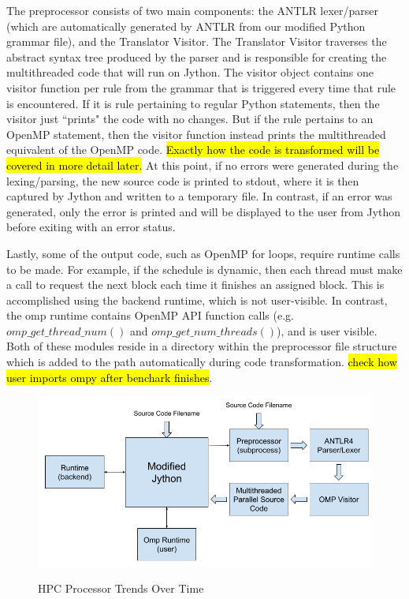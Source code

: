 \documentclass[letterpaper,12pt]{article} %
\begin{document}
The preprocessor consists of two main components: the ANTLR lexer/parser (which are automatically generated by ANTLR from our modified Python grammar file), and the Translator Visitor. The Translator Visitor traverses the abstract syntax tree produced by the parser and is responsible for creating the multithreaded code that will run on Jython. The visitor object contains one visitor function per rule from the grammar that is  triggered every time that rule is encountered. If it is rule pertaining to regular Python statements, then the visitor just ``prints" the code with no changes. But if the rule pertains to an OpenMP statement, then the visitor function instead prints the  multithreaded equivalent of the OpenMP code. \hl{Exactly how the code is transformed will be covered in more detail later.} At this point, if no errors were generated during the lexing/parsing, the new source code is printed to stdout, where it is then captured by Jython and written to a temporary file. In contrast, if an error was generated, only the error is printed and will be displayed to the user from Jython before exiting with an error status.  

Lastly, some of the output code, such as OpenMP for loops, require runtime calls to be made. For example, if the schedule is dynamic, then each thread must make a call to request the next block each time it finishes an assigned block. This is accomplished using the backend runtime, which is not user-visible. In contrast, the omp runtime contains OpenMP API function calls (e.g. $omp\_get\_thread\_num()$ and $omp\_get\_num\_threads()$), and is user visible. Both of these modules reside in a directory within the preprocessor file structure which is added to the path automatically during code transformation. \hl{check how user imports ompy after benchark finishes}.  

\begin{figure} [H]
    \centering
          {\includegraphics[width=.8\textwidth]{architecture_flow.png}}
        \caption{HPC Processor Trends Over Time}
        \label{fig:arch_flow}
    \centering
\end{figure}
\end{document}

